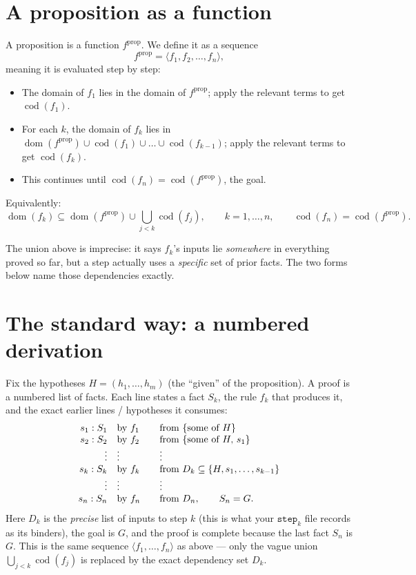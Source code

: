 \documentclass{article}
\begin{document}
\section*{A proposition as a function}

A proposition is a function $f^{\mathrm{prop}}$. We define it as a sequence
\[
  f^{\mathrm{prop}} = \langle f_1, f_2, \dots, f_n \rangle ,
\]
meaning it is evaluated step by step:
\begin{itemize}
  \item The domain of $f_1$ lies in the domain of $f^{\mathrm{prop}}$; apply the
        relevant terms to get $\operatorname{cod}(f_1)$.
  \item For each $k$, the domain of $f_k$ lies in
        $\operatorname{dom}(f^{\mathrm{prop}}) \cup \operatorname{cod}(f_1) \cup
        \dots \cup \operatorname{cod}(f_{k-1})$; apply the relevant terms to get
        $\operatorname{cod}(f_k)$.
  \item This continues until $\operatorname{cod}(f_n) = \operatorname{cod}(f^{\mathrm{prop}})$,
        the goal.
\end{itemize}

Equivalently:
\[
  \operatorname{dom}(f_k) \subseteq
    \operatorname{dom}(f^{\mathrm{prop}}) \cup
    \bigcup_{j<k} \operatorname{cod}(f_j),
  \qquad k = 1, \dots, n,
  \qquad
  \operatorname{cod}(f_n) = \operatorname{cod}(f^{\mathrm{prop}}).
\]


The union above is imprecise: it says $f_k$'s inputs lie \emph{somewhere} in
everything proved so far, but a step actually uses a \emph{specific} set of prior
facts. The two forms below name those dependencies exactly.

\section*{The standard way: a numbered derivation}

Fix the hypotheses $H = (h_1, \dots, h_m)$ (the ``given'' of the proposition).
A proof is a numbered list of facts. Each line states a fact $S_k$, the rule
$f_k$ that produces it, and the exact earlier lines / hypotheses it consumes:
\[
  \begin{array}{r@{\quad}l@{\qquad}l}
    s_1 : S_1 & \text{by } f_1 & \text{from } \{ \text{some of } H \} \\
    s_2 : S_2 & \text{by } f_2 & \text{from } \{ \text{some of } H,\, s_1 \} \\
    \vdots & \vdots & \vdots \\
    s_k : S_k & \text{by } f_k & \text{from } D_k \subseteq \{ H, s_1, \dots, s_{k-1} \} \\
    \vdots & \vdots & \vdots \\
    s_n : S_n & \text{by } f_n & \text{from } D_n, \qquad S_n = G .
  \end{array}
\]
Here $D_k$ is the \emph{precise} list of inputs to step $k$ (this is what your
$\mathtt{step}_k$ file records as its binders), the goal is $G$, and the proof is
complete because the last fact $S_n$ is $G$. This is the same sequence
$\langle f_1, \dots, f_n \rangle$ as above --- only the vague union
$\bigcup_{j<k}\operatorname{cod}(f_j)$ is replaced by the exact dependency set
$D_k$.
\end{document}
